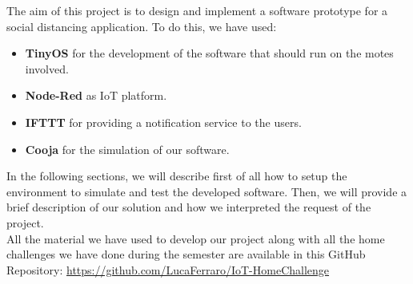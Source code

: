 
The aim of this project is to design and implement a software prototype for a social distancing application.
To do this, we have used:
\begin{itemize}
    \item \textbf{TinyOS} for the development of the software that should run on the motes involved.
    \item \textbf{Node-Red} as IoT platform.
    \item \textbf{IFTTT} for providing a notification service to the users.
    \item \textbf{Cooja} for the simulation of our software. 
\end{itemize}

In the following sections, we will describe first of all how to setup the environment to simulate and test the developed software.
Then, we will provide a brief description of our solution and how we interpreted the request of the project.\\ 
All the material we have used to develop our project along with all the home challenges we have done during the semester are
available in this GitHub Repository: \textcolor{url_blue}{\url{https://github.com/LucaFerraro/IoT-HomeChallenge}}